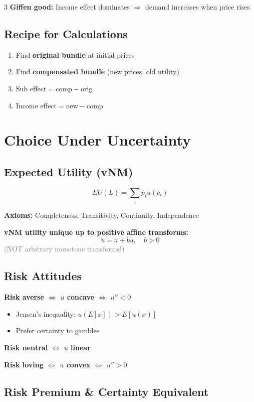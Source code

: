 \documentclass[10pt,landscape]{article}
\newcommand{\note}[1]{\textcolor{gray}{\small(#1)}}
\begin{document}
\begin{multicols}{3}
\textbf{Giffen good:} Income effect dominates $\Rightarrow$ demand increases when price rises

\subsection{Recipe for Calculations}
\begin{enumerate}[leftmargin=*,noitemsep]
\item Find \textbf{original bundle} at initial prices
\item Find \textbf{compensated bundle} (new prices, old utility)
\item $\text{Sub effect} = \text{comp} - \text{orig}$
\item $\text{Income effect} = \text{new} - \text{comp}$
\end{enumerate}

\section{Choice Under Uncertainty}

\subsection{Expected Utility (vNM)}
$$EU(L) = \sum_{i} p_i u(c_i)$$

\textbf{Axioms:} Completeness, Transitivity, Continuity, Independence

\textbf{vNM utility unique up to positive affine transforms:}
$$\tilde{u} = a + bu, \quad b > 0$$
\note{NOT arbitrary monotone transforms!}

\subsection{Risk Attitudes}

\textbf{Risk averse $\Leftrightarrow$ $u$ concave $\Leftrightarrow$ $u'' < 0$}
\begin{itemize}[leftmargin=*,noitemsep]
\item Jensen's inequality: $u(E[x]) > E[u(x)]$
\item Prefer certainty to gambles
\end{itemize}

\textbf{Risk neutral $\Leftrightarrow$ $u$ linear}

\textbf{Risk loving $\Leftrightarrow$ $u$ convex $\Leftrightarrow$ $u'' > 0$}

\subsection{Risk Premium \& Certainty Equivalent}


\end{multicols}
\end{document}
